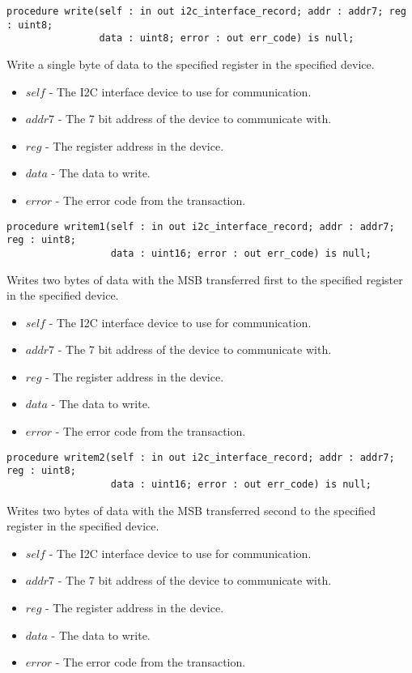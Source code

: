 \documentclass[10pt, openany]{book}
\newcommand{\indexfunc}[1]{\index[func]{#1}}
\begin{document}
\begin{lstlisting}
procedure write(self : in out i2c_interface_record; addr : addr7; reg : uint8;
                data : uint8; error : out err_code) is null;
\end{lstlisting}
\indexfunc{write}
Write a single byte of data to the specified register in the specified device.
\begin{itemize}
  \item $self$ - The I2C interface device to use for communication.
  \item $addr7$ - The 7 bit address of the device to communicate with.
  \item $reg$ - The register address in the device.
  \item $data$ - The data to write.
  \item $error$ - The error code from the transaction.
\end{itemize}

\begin{lstlisting}
procedure writem1(self : in out i2c_interface_record; addr : addr7; reg : uint8;
                  data : uint16; error : out err_code) is null;
\end{lstlisting}
\indexfunc{writem1}
Writes two bytes of data with the MSB transferred first to the specified register in the specified device.
\begin{itemize}
  \item $self$ - The I2C interface device to use for communication.
  \item $addr7$ - The 7 bit address of the device to communicate with.
  \item $reg$ - The register address in the device.
  \item $data$ - The data to write.
  \item $error$ - The error code from the transaction.
\end{itemize}

\begin{lstlisting}
procedure writem2(self : in out i2c_interface_record; addr : addr7; reg : uint8;
                  data : uint16; error : out err_code) is null;
\end{lstlisting}
\indexfunc{writem2}
Writes two bytes of data with the MSB transferred second to the specified register in the specified device.
\begin{itemize}
  \item $self$ - The I2C interface device to use for communication.
  \item $addr7$ - The 7 bit address of the device to communicate with.
  \item $reg$ - The register address in the device.
  \item $data$ - The data to write.
  \item $error$ - The error code from the transaction.
\end{itemize}
\end{document}
